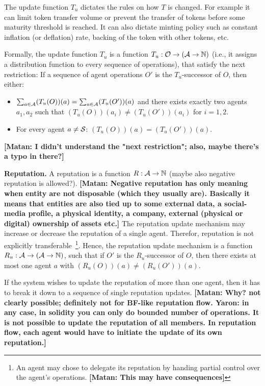 \documentclass[10pt]{llncs}
\newcommand{\nat}{\mathbb{N}}
\newcommand{\MyComment}[1]{{\textbf{\color{blue} [Matan: #1]}}}
\begin{document}
The update function $T_u$ dictates the rules on how $T$ is changed.
For example it can limit token transfer volume or prevent the transfer of tokens before some maturity threshold is reached.
It can also dictate minting policy such as constant inflation (or deflation) rate, backing of the token with other tokens, etc.


Formally, the update function $T_u$ is a function $T_u:\AgentOperations \to (\Agents \to \nat)$ (i.e., it assigns a distribution function to every sequence of operations), that satisfy the next restriction:
If a sequence of agent operations $O'$ is the $T_u$-successor of $O$, then either:
\begin{itemize}
\item $\sum_{a\in\mathcal{A}} (T_u(O))(a) = \sum_{a\in\mathcal{A}} (T_u(O'))(a)$ and
there exists exactly two agents $a_1,a_2$ such that $(T_u(O))(a_i) \neq (T_u(O'))(a_i)$ for $i=1,2$.
\item For every agent $a\neq \mathcal{S}$: $(T_u(O))(a) = (T_u(O'))(a)$.
\end{itemize}
\MyComment{I didn't understand the "next restriction"; also, maybe there's a typo in there?}

\noindent \textbf{Reputation.}
A reputation is a function $R:\Agents \to \nat$ (maybe also negative reputation is allowed?).
\MyComment{Negative reputation has only meaning when entity are not disposable (which they usually are). Basically it means that entities are also tied up to some external data, a social-media profile, a physical identity, a company, external (physical or digital) ownership of assets etc.}
The reputation update mechanism may increase or decrease the reputation of a single agent. Therefor, reputation is not explicitly transferable~\footnote{An agent may chose to delegate its reputation by handing partial control over the agent's operations. \MyComment{This may have consequences}}.
Hence, the reputation update mechanism is a function $R_u : \Agents \to (\Agents\to \nat)$, such that if $O'$ is the $R_u$-successor of $O$, then there exists at most one agent $a$ with $(R_u(O))(a)\neq(R_u(O'))(a)$.  

If the system wishes to update the reputation of more than one agent, then it has to break it down to a sequence of single reputation updates. \MyComment{Why? not clearly possible; definitely not for BF-like reputation flow. Yaron: in any case, in solidity you can only do bounded number of operations. It is not possible to update the reputation of all members. In reputation flow, each agent would have to initiate the update of its own reputation.}
\end{document}
